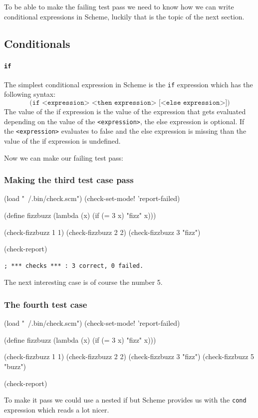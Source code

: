 \documentclass[12pt,a4paper,english,twoside]{article}
\begin{document}
To be able to make the failing test pass we need to know how we can write 
conditional expressions in Scheme, luckily that is the topic of the next 
section.

\subsection{Conditionals}
\paragraph{\texttt{if}}
The simplest conditional expression in Scheme is the \texttt{if} expression 
which
has the following syntax:
\begin{equation*}
    \texttt{(if <expression> <then expression> [<else expression>])}
\end{equation*}
The value of the if expression is the value of the expression that gets 
evaluated depending on the value of the \texttt{<expression>}, the else 
expression is optional. If the \texttt{<expression>} evaluates to false and 
the else expression is missing than the value of the if expression is 
undefined.

Now we can make our failing test pass:
\subsubsection{Making the third test case pass}
\begin{schemecode}
(load "~/.bin/check.scm")
(check-set-mode! 'report-failed)

(define fizzbuzz 
  (lambda (x) 
    (if (= 3 x) "fizz" x)))

(check-fizzbuzz 1 1)
(check-fizzbuzz 2 2)
(check-fizzbuzz 3 "fizz")

(check-report)
\end{schemecode}
\begin{lstlisting}
; *** checks *** : 3 correct, 0 failed.
\end{lstlisting}
The next interesting case is of course the number 5.  
\subsubsection{The fourth test case}
\begin{schemecode}
(load "~/.bin/check.scm")
(check-set-mode! 'report-failed)

(define fizzbuzz 
  (lambda (x) 
    (if (= 3 x) "fizz" x)))

(check-fizzbuzz 1 1)
(check-fizzbuzz 2 2)
(check-fizzbuzz 3 "fizz")
(check-fizzbuzz 5 "buzz")

(check-report)
\end{schemecode}
To make it pass we could use a nested if but Scheme provides us with the 
\texttt{cond} expression which reads a lot nicer.
\end{document}
